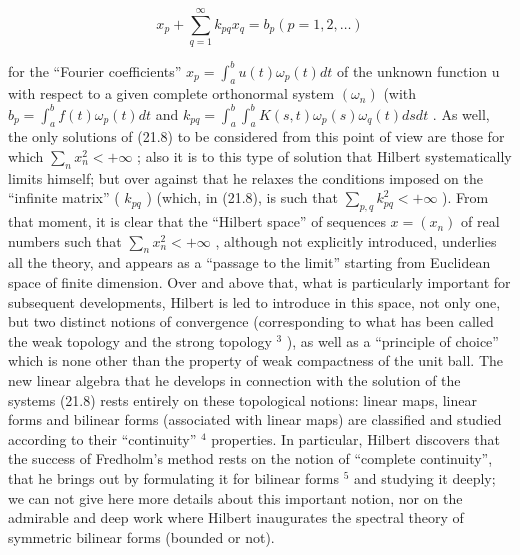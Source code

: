 \[
x _ {p} + \sum_ {q = 1} ^ {\infty} k _ {p q} x _ {q} = b _ {p} (p = 1, 2, \dots)\tag{21.8}
\]

for the ``Fourier coefficients'' \(x_{p} = \int_{a}^{b} u(t) \omega_{p}(t) dt\) of the unknown function u with respect to a given complete orthonormal system \((\omega_{n})\) (with \(b_{p} = \int_{a}^{b} f(t) \omega_{p}(t) dt\) and \(k_{pq} = \int_{a}^{b} \int_{a}^{b} K(s, t) \omega_{p}(s) \omega_{q}(t) ds dt\) . As well, the only solutions of (21.8) to be considered from this point of view are those for which \(\sum_{n} x_{n}^{2} < +\infty\) ; also it is to this type of solution that Hilbert systematically limits himself; but over against that he relaxes the conditions imposed on the ``infinite matrix'' ( \(k_{pq}\) ) (which, in (21.8), is such that \(\sum_{p,q} k_{pq}^{2} < +\infty\) ). From that moment, it is clear that the ``Hilbert space'' of sequences \(x = (x_{n})\) of real numbers such that \(\sum_{n} x_{n}^{2} < +\infty\) , although not explicitly introduced, underlies all the theory, and appears as a ``passage to the limit'' starting from Euclidean space of finite dimension. Over and above that, what is particularly important for subsequent developments, Hilbert is led to introduce in this space, not only one, but two distinct notions of convergence (corresponding to what has been called the weak topology and the strong topology \(^{3}\) ), as well as a ``principle of choice'' which is none other than the property of weak compactness of the unit ball. The new linear algebra that he develops in connection with the solution of the systems (21.8) rests entirely on these topological notions: linear maps, linear forms and bilinear forms (associated with linear maps) are classified and studied according to their ``continuity'' \(^{4}\) properties. In particular, Hilbert discovers that the success of Fredholm's method rests on the notion of ``complete continuity'', that he brings out by formulating it for bilinear forms \(^{5}\) and studying it deeply; we can not give here more details about this important notion, nor on the admirable and deep work where Hilbert inaugurates the spectral theory of symmetric bilinear forms (bounded or not).

